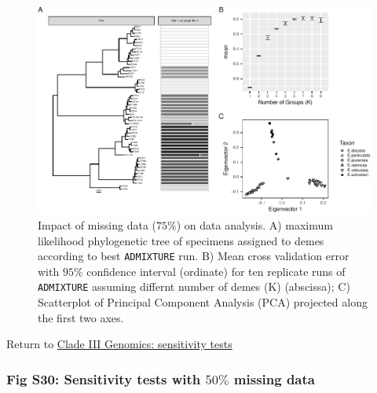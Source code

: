 \documentclass[
  11pt,
]{article}
\begin{document}
\begin{figure}
\includegraphics{Supplementary_Material_files/figure-latex/cladeIIIgenomicSensitivityAnalysesLargestplots-1} \caption{Impact of missing data ($75\%$) on data analysis. A) maximum likelihood phylogenetic tree of specimens assigned to demes according to best \texttt{ADMIXTURE} run. B) Mean cross validation error with $95\%$ confidence interval (ordinate) for ten replicate runs of \texttt{ADMIXTURE} assuming differnt number of demes (K) (abscissa); C) Scatterplot of Principal Component Analysis (PCA) projected along the first two axes.}\label{fig:cladeIIIgenomicSensitivityAnalysesLargestplots}
\end{figure}

Return to \protect\hyperlink{sensitivity-tests-2}{Clade III Genomics: sensitivity tests}
\pagebreak

\hypertarget{fig-s30-sensitivity-tests-with-50-missing-data}{%
\subsubsection{\texorpdfstring{Fig S30: Sensitivity tests with \(50\%\) missing data}{Fig S30: Sensitivity tests with 50\textbackslash\% missing data}}\label{fig-s30-sensitivity-tests-with-50-missing-data}}
\end{document}
